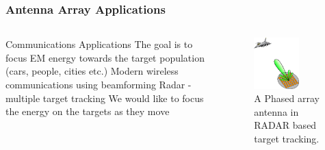 \documentclass[10pt]{beamer}
\begin{document}
\begin{frame}
        \frametitle{Antenna Array Applications}
        \begin{columns}[T]
            \begin{column}{.4\textwidth}
                \begin{outline}
                    \1 Communications Applications
                    \2 The goal is to focus EM energy towards the target population (cars, people, cities etc.)
                    \3 Modern wireless communications using beamforming
                    \1 Radar - multiple target tracking
                    \2 We would like to focus the energy on the targets as they move
                \end{outline}
            \end{column}
            \begin{column}{.6\textwidth}
                \begin{figure}[h!]
                    \centering
                    \includegraphics[width=0.65\textwidth]{arrays_motivation.pdf}
                    \caption{A Phased array antenna in RADAR based target tracking.}
                \end{figure}
            \end{column}
        \end{columns}

\end{frame}
\end{document}
